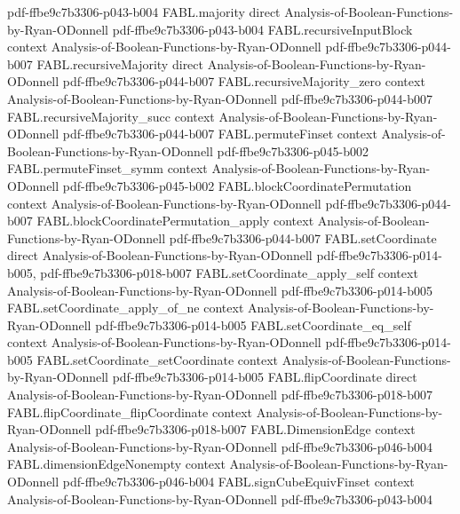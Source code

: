 \begin{theorem}
  {pdf-ffbe9c7b3306-p043-b004}
\proofstep
  {FABL.majority}
  {direct}
  {Analysis-of-Boolean-Functions-by-Ryan-ODonnell}
  {pdf-ffbe9c7b3306-p043-b004}
\proofstep
  {FABL.recursiveInputBlock}
  {context}
  {Analysis-of-Boolean-Functions-by-Ryan-ODonnell}
  {pdf-ffbe9c7b3306-p044-b007}
\proofstep
  {FABL.recursiveMajority}
  {direct}
  {Analysis-of-Boolean-Functions-by-Ryan-ODonnell}
  {pdf-ffbe9c7b3306-p044-b007}
\proofstep
  {FABL.recursiveMajority_zero}
  {context}
  {Analysis-of-Boolean-Functions-by-Ryan-ODonnell}
  {pdf-ffbe9c7b3306-p044-b007}
\proofstep
  {FABL.recursiveMajority_succ}
  {context}
  {Analysis-of-Boolean-Functions-by-Ryan-ODonnell}
  {pdf-ffbe9c7b3306-p044-b007}
\proofstep
  {FABL.permuteFinset}
  {context}
  {Analysis-of-Boolean-Functions-by-Ryan-ODonnell}
  {pdf-ffbe9c7b3306-p045-b002}
\proofstep
  {FABL.permuteFinset_symm}
  {context}
  {Analysis-of-Boolean-Functions-by-Ryan-ODonnell}
  {pdf-ffbe9c7b3306-p045-b002}
\proofstep
  {FABL.blockCoordinatePermutation}
  {context}
  {Analysis-of-Boolean-Functions-by-Ryan-ODonnell}
  {pdf-ffbe9c7b3306-p044-b007}
\proofstep
  {FABL.blockCoordinatePermutation_apply}
  {context}
  {Analysis-of-Boolean-Functions-by-Ryan-ODonnell}
  {pdf-ffbe9c7b3306-p044-b007}
\proofstep
  {FABL.setCoordinate}
  {direct}
  {Analysis-of-Boolean-Functions-by-Ryan-ODonnell}
  {pdf-ffbe9c7b3306-p014-b005,
    pdf-ffbe9c7b3306-p018-b007}
\proofstep
  {FABL.setCoordinate_apply_self}
  {context}
  {Analysis-of-Boolean-Functions-by-Ryan-ODonnell}
  {pdf-ffbe9c7b3306-p014-b005}
\proofstep
  {FABL.setCoordinate_apply_of_ne}
  {context}
  {Analysis-of-Boolean-Functions-by-Ryan-ODonnell}
  {pdf-ffbe9c7b3306-p014-b005}
\proofstep
  {FABL.setCoordinate_eq_self}
  {context}
  {Analysis-of-Boolean-Functions-by-Ryan-ODonnell}
  {pdf-ffbe9c7b3306-p014-b005}
\proofstep
  {FABL.setCoordinate_setCoordinate}
  {context}
  {Analysis-of-Boolean-Functions-by-Ryan-ODonnell}
  {pdf-ffbe9c7b3306-p014-b005}
\proofstep
  {FABL.flipCoordinate}
  {direct}
  {Analysis-of-Boolean-Functions-by-Ryan-ODonnell}
  {pdf-ffbe9c7b3306-p018-b007}
\proofstep
  {FABL.flipCoordinate_flipCoordinate}
  {context}
  {Analysis-of-Boolean-Functions-by-Ryan-ODonnell}
  {pdf-ffbe9c7b3306-p018-b007}
\proofstep
  {FABL.DimensionEdge}
  {context}
  {Analysis-of-Boolean-Functions-by-Ryan-ODonnell}
  {pdf-ffbe9c7b3306-p046-b004}
\proofstep
  {FABL.dimensionEdgeNonempty}
  {context}
  {Analysis-of-Boolean-Functions-by-Ryan-ODonnell}
  {pdf-ffbe9c7b3306-p046-b004}
\proofstep
  {FABL.signCubeEquivFinset}
  {context}
  {Analysis-of-Boolean-Functions-by-Ryan-ODonnell}
  {pdf-ffbe9c7b3306-p043-b004}

\end{theorem}
